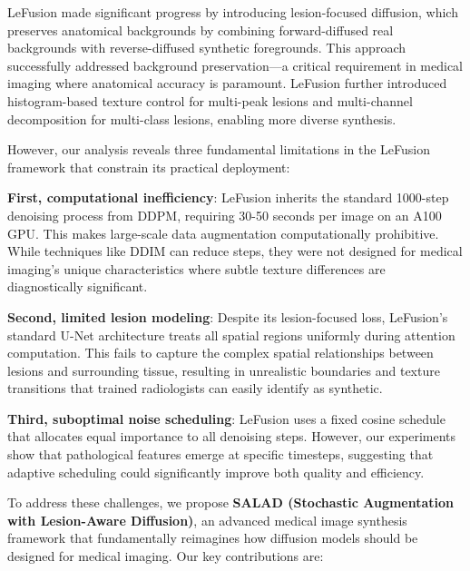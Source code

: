\documentclass[10pt,twocolumn,letterpaper]{article}
\begin{document}
LeFusion \cite{zhang2025lefusion} made significant progress by introducing lesion-focused diffusion, which preserves anatomical backgrounds by combining forward-diffused real backgrounds with reverse-diffused synthetic foregrounds. This approach successfully addressed background preservation—a critical requirement in medical imaging where anatomical accuracy is paramount. LeFusion further introduced histogram-based texture control for multi-peak lesions and multi-channel decomposition for multi-class lesions, enabling more diverse synthesis.

However, our analysis reveals three fundamental limitations in the LeFusion framework that constrain its practical deployment:

\textbf{First, computational inefficiency}: LeFusion inherits the standard 1000-step denoising process from DDPM, requiring 30-50 seconds per image on an A100 GPU. This makes large-scale data augmentation computationally prohibitive. While techniques like DDIM can reduce steps, they were not designed for medical imaging's unique characteristics where subtle texture differences are diagnostically significant.

\textbf{Second, limited lesion modeling}: Despite its lesion-focused loss, LeFusion's standard U-Net architecture treats all spatial regions uniformly during attention computation. This fails to capture the complex spatial relationships between lesions and surrounding tissue, resulting in unrealistic boundaries and texture transitions that trained radiologists can easily identify as synthetic.

\textbf{Third, suboptimal noise scheduling}: LeFusion uses a fixed cosine schedule that allocates equal importance to all denoising steps. However, our experiments show that pathological features emerge at specific timesteps, suggesting that adaptive scheduling could significantly improve both quality and efficiency.

To address these challenges, we propose \textbf{SALAD (Stochastic Augmentation with Lesion-Aware Diffusion)}, an advanced medical image synthesis framework that fundamentally reimagines how diffusion models should be designed for medical imaging. Our key contributions are:
\end{document}
